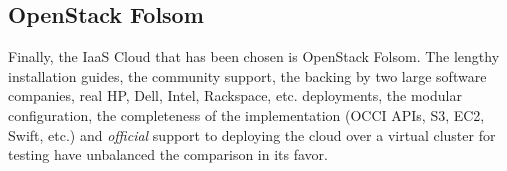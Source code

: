 \subsection{OpenStack Folsom}\label{subsec:openstackfolsom}

\noindent Finally, the IaaS Cloud that has been chosen is OpenStack Folsom. The lengthy installation guides, the community support, the backing by two large software companies, real HP, Dell, Intel, Rackspace, etc. deployments, the modular configuration, the completeness of the implementation (OCCI APIs, S3, EC2, Swift, etc.) and \emph{official} support to deploying the cloud over a virtual cluster for testing have unbalanced the comparison in its favor.
